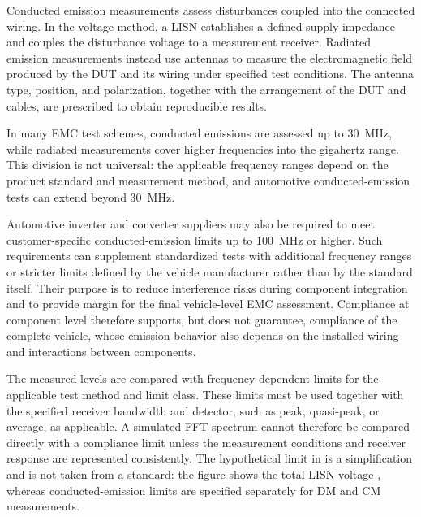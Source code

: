 Conducted emission measurements assess disturbances coupled into the connected wiring.
In the voltage method, a LISN establishes a defined supply impedance and couples the disturbance voltage to a measurement receiver.
Radiated emission measurements instead use antennas to measure the electromagnetic field produced by the DUT and its wiring under specified test conditions.
The antenna type, position, and polarization, together with the arrangement of the DUT and cables, are prescribed to obtain reproducible results.

In many EMC test schemes, conducted emissions are assessed up to \SI{30}{\mega\hertz}, while radiated measurements cover higher frequencies into the gigahertz range.
This division is not universal: the applicable frequency ranges depend on the product standard and measurement method, and automotive conducted-emission tests can extend beyond \SI{30}{\mega\hertz}.

Automotive inverter and converter suppliers may also be required to meet customer-specific conducted-emission limits up to \SI{100}{\mega\hertz} or higher.
Such requirements can supplement standardized tests with additional frequency ranges or stricter limits defined by the vehicle manufacturer rather than by the standard itself.
Their purpose is to reduce interference risks during component integration and to provide margin for the final vehicle-level EMC assessment.
Compliance at component level therefore supports, but does not guarantee, compliance of the complete vehicle, whose emission behavior also depends on the installed wiring and interactions between components.

The measured levels are compared with frequency-dependent limits for the applicable test method and limit class.
These limits must be used together with the specified receiver bandwidth and detector, such as peak, quasi-peak, or average, as applicable.
A simulated FFT spectrum cannot therefore be compared directly with a compliance limit unless the measurement conditions and receiver response are represented consistently.
The hypothetical limit in  is a simplification and is not taken from a standard: the figure shows the total LISN voltage , whereas conducted-emission limits are specified separately for DM and CM measurements.
